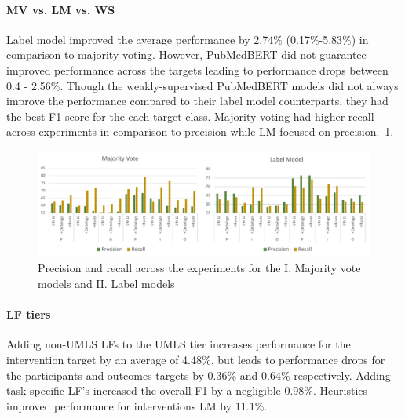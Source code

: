 \documentclass[10.7pt,]{article}
\let\oldparagraph\paragraph
\renewcommand{\paragraph}[1]{\oldparagraph{#1}\mbox{}}
\begin{document}
\paragraph{MV vs. LM vs. WS}
Label model improved the average performance by 2.74\% (0.17\%-5.83\%) in comparison to majority voting.
However, PubMedBERT did not guarantee improved performance across the targets leading to performance drops between 0.4 - 2.56\%.
Though the weakly-supervised PubMedBERT models did not always improve the performance compared to their label model counterparts, they had the best F1 score for the each target class.
Majority voting had higher recall across experiments in comparison to precision while LM focused on precision.~\ref{fig:precRecall}.

\begin{figure}
    \centering
    \includegraphics{figures/precRecall.pdf}
    \caption{Precision and recall across the experiments for the I. Majority vote models and II. Label models}
    \label{fig:precRecall}
\end{figure}

\paragraph{LF tiers}
Adding non-UMLS LFs to the UMLS tier increases performance for the intervention target by an average of 4.48\%, but leads to performance drops for the participants and outcomes targets by 0.36\% and 0.64\% respectively.
Adding task-specific LF's increased the overall F1 by a negligible 0.98\%.
Heuristics improved performance for interventions LM by 11.1\%.
%
%
%
\end{document}
